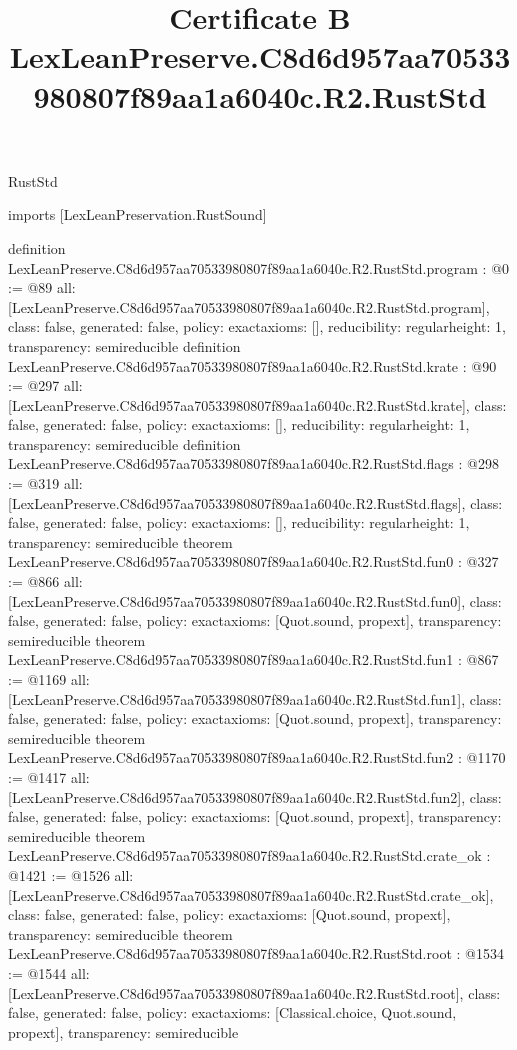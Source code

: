 \begin{lexlean}{RustStd}
\title{Certificate B LexLeanPreserve.C8d6d957aa70533980807f89aa1a6040c.R2.RustStd}
\begin{coremodule}
imports [LexLeanPreservation.RustSound]

definition LexLeanPreserve.C8d6d957aa70533980807f89aa1a6040c.R2.RustStd.program : @0 := @89 {
  all: [LexLeanPreserve.C8d6d957aa70533980807f89aa1a6040c.R2.RustStd.program],
  class: false,
  generated: false,
  policy: exact{axioms: []},
  reducibility: regular{height: 1},
  transparency: semireducible
}
definition LexLeanPreserve.C8d6d957aa70533980807f89aa1a6040c.R2.RustStd.krate : @90 := @297 {
  all: [LexLeanPreserve.C8d6d957aa70533980807f89aa1a6040c.R2.RustStd.krate],
  class: false,
  generated: false,
  policy: exact{axioms: []},
  reducibility: regular{height: 1},
  transparency: semireducible
}
definition LexLeanPreserve.C8d6d957aa70533980807f89aa1a6040c.R2.RustStd.flags : @298 := @319 {
  all: [LexLeanPreserve.C8d6d957aa70533980807f89aa1a6040c.R2.RustStd.flags],
  class: false,
  generated: false,
  policy: exact{axioms: []},
  reducibility: regular{height: 1},
  transparency: semireducible
}
theorem LexLeanPreserve.C8d6d957aa70533980807f89aa1a6040c.R2.RustStd.fun0 : @327 := @866 {
  all: [LexLeanPreserve.C8d6d957aa70533980807f89aa1a6040c.R2.RustStd.fun0],
  class: false,
  generated: false,
  policy: exact{axioms: [Quot.sound, propext]},
  transparency: semireducible
}
theorem LexLeanPreserve.C8d6d957aa70533980807f89aa1a6040c.R2.RustStd.fun1 : @867 := @1169 {
  all: [LexLeanPreserve.C8d6d957aa70533980807f89aa1a6040c.R2.RustStd.fun1],
  class: false,
  generated: false,
  policy: exact{axioms: [Quot.sound, propext]},
  transparency: semireducible
}
theorem LexLeanPreserve.C8d6d957aa70533980807f89aa1a6040c.R2.RustStd.fun2 : @1170 := @1417 {
  all: [LexLeanPreserve.C8d6d957aa70533980807f89aa1a6040c.R2.RustStd.fun2],
  class: false,
  generated: false,
  policy: exact{axioms: [Quot.sound, propext]},
  transparency: semireducible
}
theorem LexLeanPreserve.C8d6d957aa70533980807f89aa1a6040c.R2.RustStd.crate_ok : @1421 := @1526 {
  all: [LexLeanPreserve.C8d6d957aa70533980807f89aa1a6040c.R2.RustStd.crate_ok],
  class: false,
  generated: false,
  policy: exact{axioms: [Quot.sound, propext]},
  transparency: semireducible
}
theorem LexLeanPreserve.C8d6d957aa70533980807f89aa1a6040c.R2.RustStd.root : @1534 := @1544 {
  all: [LexLeanPreserve.C8d6d957aa70533980807f89aa1a6040c.R2.RustStd.root],
  class: false,
  generated: false,
  policy: exact{axioms: [Classical.choice, Quot.sound, propext]},
  transparency: semireducible
}


\end{coremodule}
\end{lexlean}
